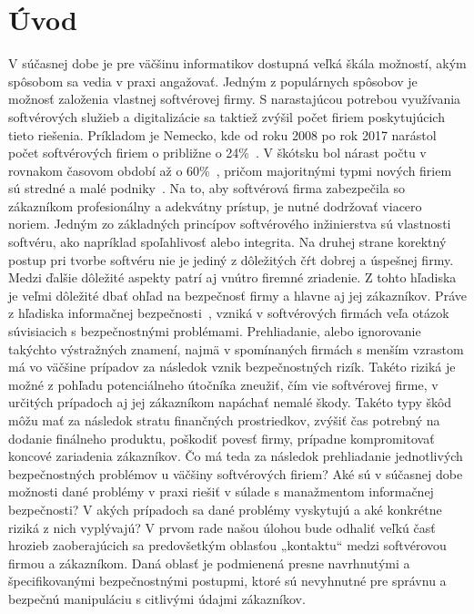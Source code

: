 \chapter{Úvod}\label{ch:úvod}

V súčasnej dobe je pre väčšinu informatikov dostupná veľká škála možností, akým spôsobom sa vedia v praxi angažovať.
Jedným z populárnych spôsobov je možnosť založenia vlastnej softvérovej firmy.
S narastajúcou potrebou využívania softvérových služieb a digitalizácie sa taktiež zvýšil počet firiem poskytujúcich tieto riešenia.
Príkladom je Nemecko, kde od roku 2008 po rok 2017 narástol počet softvérových firiem o približne o 24\%~\cite{CompaniesGerman}.
V škótsku bol nárast počtu v rovnakom časovom období až o 60\%~\cite{SoftwareBusiness}, pričom majoritnými typmi nových
firiem sú stredné a malé podniky~\cite{CompaniesScotch}.
Na to, aby softvérová firma zabezpečila so zákazníkom profesionálny a adekvátny prístup, je nutné dodržovať viacero noriem.
Jedným zo základných princípov softvérového inžinierstva sú vlastnosti softvéru, ako napríklad spoľahlivosť alebo integrita.
Na druhej strane korektný postup pri tvorbe softvéru nie je jediný z dôležitých čŕt dobrej a úspešnej firmy.
Medzi ďalšie dôležité aspekty patrí aj vnútro firemné zriadenie.
Z tohto hľadiska je veľmi dôležité dbať ohľad na bezpečnosť firmy a hlavne aj jej zákazníkov.
Práve z hľadiska informačnej bezpečnosti~\cite{IB}, vzniká v softvérových firmách veľa otázok súvisiacich s bezpečnostnými problémami.
Prehliadanie, alebo ignorovanie takýchto výstražných znamení, najmä v spomínaných firmách s menším vzrastom má vo väčšine
prípadov za následok vznik bezpečnostných rizík.
Takéto riziká je možné z pohľadu potenciálneho útočníka zneužiť, čím vie softvérovej firme, v určitých prípadoch aj jej
zákazníkom napáchať nemalé škody.
Takéto typy škôd môžu mať za následok stratu finančných prostriedkov, zvýšiť čas potrebný na dodanie finálneho
produktu, poškodiť povesť firmy, prípadne kompromitovať koncové zariadenia zákazníkov.
Čo má teda za následok prehliadanie jednotlivých bezpečnostných problémov u väčšiny softvérových firiem?
Aké sú v súčasnej dobe možnosti dané problémy v praxi riešiť v súlade s manažmentom informačnej bezpečnosti?
V akých prípadoch sa dané problémy vyskytujú a aké konkrétne riziká z nich vyplývajú?
V prvom rade našou úlohou bude odhaliť veľkú časť hrozieb zaoberajúcich sa predovšetkým oblasťou „kontaktu“ medzi softvérovou firmou a zákazníkom.
Daná oblasť je podmienená presne navrhnutými a špecifikovanými bezpečnostnými
postupmi, ktoré sú nevyhnutné pre správnu a bezpečnú manipuláciu s citlivými údajmi zákazníkov.

